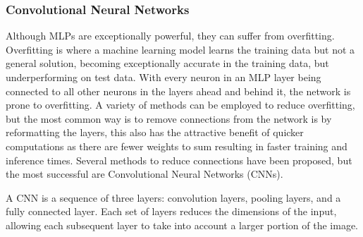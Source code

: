 \subsubsection{Convolutional Neural Networks}
\label{sec:cnns}

Although MLPs are exceptionally powerful, they can suffer from overfitting. Overfitting is where a machine learning model learns the training data but not a general solution, becoming exceptionally accurate in the training data, but underperforming on test data. With every neuron in an MLP layer being connected to all other neurons in the layers ahead and behind it, the network is prone to overfitting\cite{o2015introduction}. A variety of methods can be employed to reduce overfitting, but the most common way is to remove connections from the network is by reformatting the layers, this also has the attractive benefit of quicker computations as there are fewer weights to sum resulting in faster training and inference times. Several methods to reduce connections have been proposed, but the most successful are Convolutional Neural Networks (CNNs).

A CNN is a sequence of three layers: convolution layers, pooling layers, and a fully connected layer\cite{ibmconvolutional}. Each set of layers reduces the dimensions of the input, allowing each subsequent layer to take into account a larger portion of the image.

